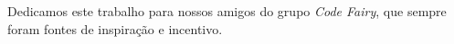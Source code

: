 \begin{dedicatoria}
\vspace*{\fill}
Dedicamos este trabalho para nossos amigos do grupo \textit{Code Fairy}, que sempre foram fontes de inspiração e incentivo.
\vspace*{\fill}
\end{dedicatoria}
